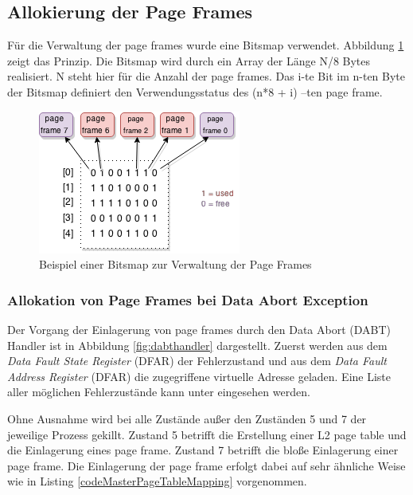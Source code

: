 

\subsection{Allokierung der Page Frames}

Für die Verwaltung der page frames wurde eine Bitsmap verwendet. Abbildung \ref{fig:BitsMap} zeigt das Prinzip.
Die Bitsmap wird durch ein Array der Länge N/8 Bytes realisiert. N steht hier für die Anzahl der page frames. Das i-te Bit im n-ten Byte der Bitsmap definiert den Verwendungsstatus des (n*8 + i) –ten page frame.




\begin{figure}[H]
	\centering
	\includegraphics[scale=1]{chapters/mmu/figures/BitsMap}
	\caption{Beispiel einer Bitsmap zur Verwaltung der Page Frames}
	\label{fig:BitsMap}
\end{figure}

\subsubsection{Allokation von Page Frames bei Data Abort Exception}

Der Vorgang der Einlagerung von page frames durch den Data Abort (DABT) Handler ist in Abbildung \ref{fig:dabthandler} dargestellt. Zuerst werden aus dem \emph{Data Fault State Register} (DFAR) der Fehlerzustand und aus dem \emph{Data Fault Address Register} (DFAR) die zugegriffene virtuelle Adresse geladen. Eine Liste aller möglichen Fehlerzustände kann unter \cite[B3-1415]{ARM:ARM} eingesehen werden.

Ohne Ausnahme wird bei alle Zustände außer den Zuständen 5 und 7 der jeweilige Prozess gekillt. Zustand 5 betrifft die Erstellung einer L2 page table und die Einlagerung eines page frame. Zustand 7 betrifft die bloße Einlagerung einer page frame. Die Einlagerung der page frame erfolgt dabei auf sehr ähnliche Weise wie in Listing \ref{codeMasterPageTableMapping} vorgenommen.

